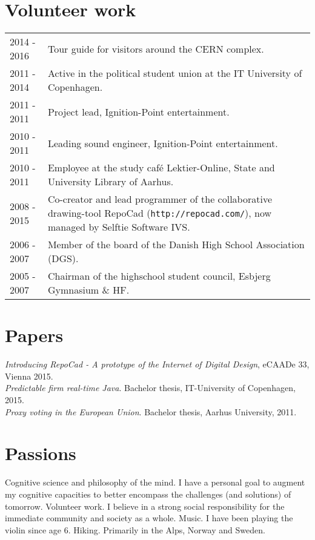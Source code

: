 \documentclass[12pt,a4paper,notitlepage]{article}
\begin{document}
\section*{Volunteer work}
\begin{tabularx}{\textwidth}{l X}
2014 - 2016 & Tour guide for visitors around the CERN complex. \\
2011 - 2014 & Active in the political student union at the IT University of Copenhagen. \\
2011 - 2011 & Project lead, Ignition-Point entertainment. \\
2010 - 2011 & Leading sound engineer, Ignition-Point entertainment. \\
2010 - 2011 & Employee at the study café Lektier-Online, State and University  Library of Aarhus.  \\
2008 - 2015 & Co-creator and lead programmer of the collaborative drawing-tool
              RepoCad (\texttt{http://repocad.com/}), now managed by Selftie Software IVS. \\
2006 - 2007 & Member of the board of the Danish High School Association (DGS). \\
2005 - 2007 & Chairman of the highschool student council, Esbjerg Gymnasium \& HF.
\end{tabularx}

\section*{Papers}
\textit{Introducing RepoCad  - A prototype of the Internet of Digital Design}, eCAADe 33, Vienna 2015. \\
\textit{Predictable firm real-time Java}. Bachelor thesis, IT-University of Copenhagen, 2015. \\
\textit{Proxy voting in the European Union}. Bachelor thesis, Aarhus University, 2011.

\section*{Passions}
Cognitive science and philosophy of the mind. I have a personal goal to augment
my cognitive capacities to better encompass the challenges (and solutions) of tomorrow.
\vskip4pt
\noindent
Volunteer work. I believe in a strong social responsibility for the immediate community and society as a whole.
\vskip4pt
\noindent
Music. I have been playing the violin since age 6.
\vskip4pt
\noindent
Hiking. Primarily in the Alps, Norway and Sweden.
\vskip4pt
\noindent
\end{document}

